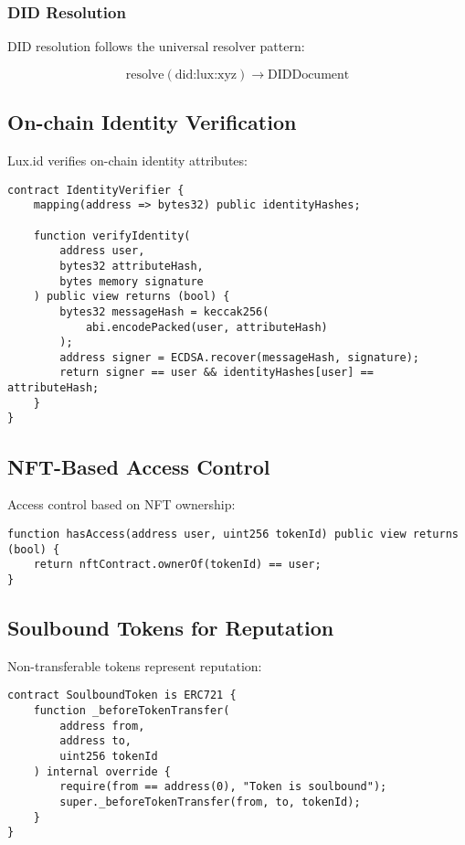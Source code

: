 \documentclass[11pt,a4paper]{article}
\begin{document}
\subsubsection{DID Resolution}

DID resolution follows the universal resolver pattern:

\begin{equation}
    \text{resolve}(\text{did:lux:xyz}) \rightarrow \text{DIDDocument}
\end{equation}

\subsection{On-chain Identity Verification}

Lux.id verifies on-chain identity attributes:

\begin{lstlisting}[language=Solidity]
contract IdentityVerifier {
    mapping(address => bytes32) public identityHashes;

    function verifyIdentity(
        address user,
        bytes32 attributeHash,
        bytes memory signature
    ) public view returns (bool) {
        bytes32 messageHash = keccak256(
            abi.encodePacked(user, attributeHash)
        );
        address signer = ECDSA.recover(messageHash, signature);
        return signer == user && identityHashes[user] == attributeHash;
    }
}
\end{lstlisting}

\subsection{NFT-Based Access Control}

Access control based on NFT ownership:

\begin{lstlisting}[language=Solidity]
function hasAccess(address user, uint256 tokenId) public view returns (bool) {
    return nftContract.ownerOf(tokenId) == user;
}
\end{lstlisting}

\subsection{Soulbound Tokens for Reputation}

Non-transferable tokens represent reputation:

\begin{lstlisting}[language=Solidity]
contract SoulboundToken is ERC721 {
    function _beforeTokenTransfer(
        address from,
        address to,
        uint256 tokenId
    ) internal override {
        require(from == address(0), "Token is soulbound");
        super._beforeTokenTransfer(from, to, tokenId);
    }
}
\end{lstlisting}
\end{document}
